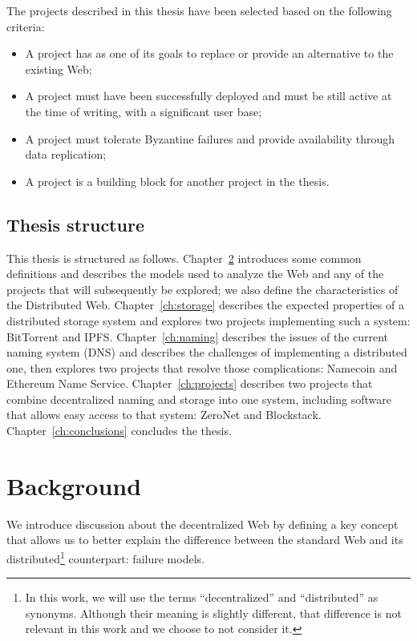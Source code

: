 \documentclass[mscthesis]{usiinfthesis}
\begin{document}
The projects described in this thesis have been selected based on the following criteria:
\begin{itemize}
	\item A project has as one of its goals to replace or provide an alternative to the existing Web;
	\item A project must have been successfully deployed and must be still active at the time of writing, with a significant user base;
	\item A project must tolerate Byzantine failures and provide availability through data replication;
	\item A project is a building block for another project in the thesis.
\end{itemize}

\section{Thesis structure}\label{sec:structure}
This thesis is structured as follows. Chapter~\ref{ch:background} introduces some common definitions and describes the models used to analyze the Web and any of the projects that will subsequently be explored; we also define the characteristics of the Distributed Web. Chapter~\ref{ch:storage} describes the expected properties of a distributed storage system and explores two projects implementing such a system: BitTorrent and IPFS. Chapter~\ref{ch:naming} describes the issues of the current naming system (DNS) and describes the challenges of implementing a distributed one, then explores two projects that resolve those complications: Namecoin and Ethereum Name Service. Chapter~\ref{ch:projects} describes two projects that combine decentralized naming and storage into one system, including software that allows easy access to that system: ZeroNet and Blockstack.
Chapter~\ref{ch:conclusions} concludes the thesis.

\chapter{Background}\label{ch:background}

We introduce discussion about the decentralized Web by defining a key concept that allows us to better explain the difference between the standard Web and its distributed\footnote{In this work, we will use the terms ``decentralized'' and ``distributed'' as synonyms. Although their meaning is slightly different, that difference is not relevant in this work and we choose to not consider it.} counterpart: failure models.
\end{document}
